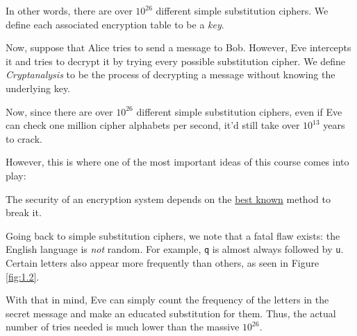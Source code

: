 \documentclass[openany]{book}
\begin{document}
In other words, there are over $10^{26}$ different simple substitution ciphers. We define each associated encryption table to be a \textit{key}.

Now, suppose that Alice tries to send a message to Bob. However, Eve intercepts it and tries to decrypt it by trying every possible substitution cipher. We define \textit{Cryptanalysis} to be the process of decrypting a message without knowing the underlying key.

Now, since there are over $10^{26}$ different simple substitution ciphers, even if Eve can check one million cipher alphabets per second, it'd still take over $10^{13}$ years to crack.

However, this is where one of the most important ideas of this course comes into play:
\begin{thm}
	The security of an encryption system depends on the \underline{best known} method to break it.
\end{thm}

Going back to simple substitution ciphers, we note that a fatal flaw exists: the English language is \textit{not} random. For example, \texttt{q} is almost always followed by \texttt{u}. Certain letters also appear more frequently than others, as seen in Figure \ref{fig:1.2}.

With that in mind, Eve can simply count the frequency of the letters in the secret message and make an educated substitution for them. Thus, the actual number of tries needed is much lower than the massive $10^{26}$.
\end{document}
